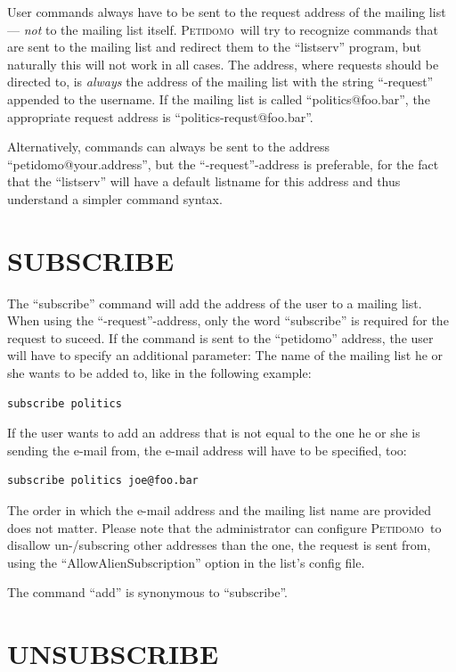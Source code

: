 \documentclass[a4paper]{report}
\newcommand{\Petidomo}{{\scshape Peti\-domo}}
\newcommand{\Index}[1]{#1\index{#1}}
\begin{document}
User commands always have to be sent to the \Index{request address} of
the mailing list --- \emph{not} to the mailing list itself. \Petidomo\
will try to recognize commands that are sent to the mailing list and
redirect them to the ``listserv'' program, but naturally this will not
work in all cases. The address, where requests should be directed to,
is \emph{always} the address of the mailing list with the string
``-request'' appended to the username. If the mailing list is called
``politics@foo.bar'', the appropriate request address is
``politics-requst@foo.bar''.

Alternatively, commands can always be sent to the address
``peti\-do\-mo@your.ad\-dress'', but the ``-request''-address is preferable,
for the fact that the ``listserv'' will have a default listname for
this address and thus understand a simpler command syntax.

\section{SUBSCRIBE}

The ``subscribe'' command will add the address of the user to a
mailing list. When using the ``-request''-address, only the word
``subscribe'' is required for the request to suceed. If the command is
sent to the ``petidomo'' address, the user will have to specify an
additional parameter: The name of the mailing list he or she wants to
be added to, like in the following example:
\begin{verbatim}
subscribe politics
\end{verbatim}

If the user wants to add an address that is not equal to the one he or
she is sending the e-mail from, the e-mail address will have to be
specified, too:
\begin{verbatim}
subscribe politics joe@foo.bar
\end{verbatim}

The order in which the e-mail address and the mailing list name are
provided does not matter. Please note that the administrator can
configure \Petidomo\ to disallow un-/subscring other addresses than
the one, the request is sent from, using the
``AllowAlienSubscription'' option in the list's config file.

The command ``add'' is synonymous to ``subscribe''.

\section{UNSUBSCRIBE}
\end{document}
